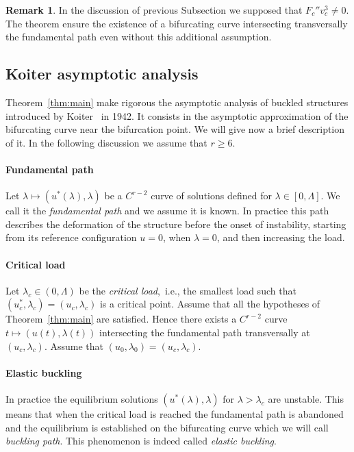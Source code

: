 \documentclass[a4paper,11pt]{article}
\theoremstyle{definition}
\newtheorem{rmk}[prop]{Remark}
\begin{document}
\begin{rmk}
In the discussion of previous Subsection we supposed that $F_c''v_c^3\neq0$. The theorem ensure the existence of a bifurcating curve intersecting transversally the fundamental path even without this additional assumption.
\end{rmk}

\subsection{Koiter asymptotic analysis}
\label{subsec:koiter}

Theorem~\ref{thm:main} make rigorous the asymptotic analysis of buckled structures introduced by Koiter~\cite{koiter} in 1942. It consists in the asymptotic approximation of the bifurcating curve near the bifurcation point. We will give now a brief description of it. In the following discussion we assume that $r\ge6$.

\paragraph{Fundamental path} Let $\lambda\mapsto(u^*(\lambda),\lambda)$ be a $C^{r-2}$ curve of solutions defined for $\lambda\in[0,\Lambda]$. We call it the \emph{fundamental path} and we assume it is known. In practice this path describes the deformation of the structure before the onset of instability, starting from its reference configuration $u=0$, when $\lambda=0$, and then increasing the load.

\paragraph{Critical load} Let $\lambda_c\in(0,\Lambda)$ be the \emph{critical load},~i.e., the smallest load such that $(u_c^*,\lambda_c)=(u_c,\lambda_c)$ is a critical point. Assume that all the hypotheses of Theorem~\ref{thm:main} are satisfied. Hence there exists a $C^{r-2}$ curve $t\mapsto(u(t),\lambda(t))$ intersecting the fundamental path transversally at $(u_c,\lambda_c)$. Assume that $(u_0,\lambda_0)=(u_c,\lambda_c)$.

\paragraph{Elastic buckling} In practice the equilibrium solutions $(u^*(\lambda),\lambda)$ for $\lambda>\lambda_c$ are unstable. This means that when the critical load is reached the fundamental path is abandoned and the equilibrium is established on the bifurcating curve which we will call \emph{buckling path}. This phenomenon is indeed called \emph{elastic buckling}.
\end{document}
